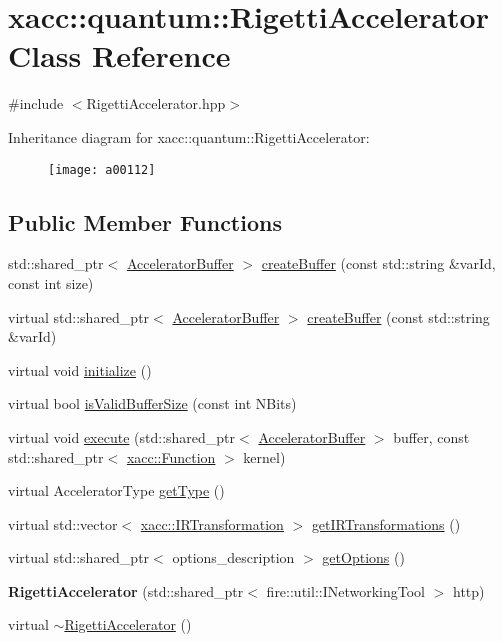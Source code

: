 \hypertarget{a00112}{}\section{xacc\+:\+:quantum\+:\+:Rigetti\+Accelerator Class Reference}
\label{a00112}


{\ttfamily \#include $<$Rigetti\+Accelerator.\+hpp$>$}

Inheritance diagram for xacc\+:\+:quantum\+:\+:Rigetti\+Accelerator\+:\begin{figure}[H]
\begin{center}
\leavevmode
\texttt{[image: a00112]}
\end{center}
\end{figure}
\subsection*{Public Member Functions}
\begin{DoxyCompactItemize}
\item 
std\+::shared\+\_\+ptr$<$ \hyperlink{a00019}{Accelerator\+Buffer} $>$ \hyperlink{a00112_a731551c94b1abef40d2cf032e8712df6}{create\+Buffer} (const std\+::string \&var\+Id, const int size)
\item 
virtual std\+::shared\+\_\+ptr$<$ \hyperlink{a00019}{Accelerator\+Buffer} $>$ \hyperlink{a00112_ada3ceb986e51ab5aa721f2a08e083cd6}{create\+Buffer} (const std\+::string \&var\+Id)
\item 
virtual void \hyperlink{a00112_ab8b6af9bb9dcb110201e9ee5cac74b4f}{initialize} ()
\item 
virtual bool \hyperlink{a00112_a61352c07062597aad2393fbeed4cc025}{is\+Valid\+Buffer\+Size} (const int N\+Bits)
\item 
virtual void \hyperlink{a00112_afce7bbd1b0f04300a9920952e9d12ef4}{execute} (std\+::shared\+\_\+ptr$<$ \hyperlink{a00019}{Accelerator\+Buffer} $>$ buffer, const std\+::shared\+\_\+ptr$<$ \hyperlink{a00059}{xacc\+::\+Function} $>$ kernel)
\item 
virtual Accelerator\+Type \hyperlink{a00112_aab0d4674da5273d55407b9ab77cde890}{get\+Type} ()
\item 
virtual std\+::vector$<$ \hyperlink{a00078}{xacc\+::\+I\+R\+Transformation} $>$ \hyperlink{a00112_a443683a1dfb000603c640b2ee303cf66}{get\+I\+R\+Transformations} ()
\item 
virtual std\+::shared\+\_\+ptr$<$ options\+\_\+description $>$ \hyperlink{a00112_a9ee9e62aecbccf193894ca3388676f9f}{get\+Options} ()
\item 
{\bfseries Rigetti\+Accelerator} (std\+::shared\+\_\+ptr$<$ fire\+::util\+::\+I\+Networking\+Tool $>$ http)\hypertarget{a00112_aa92ba39441ec9c261fbddee23a84d6ac}{}\label{a00112_aa92ba39441ec9c261fbddee23a84d6ac}

\item 
virtual \hyperlink{a00112_a7c86895d1c29afa8b7e18476144a3fcf}{$\sim$\+Rigetti\+Accelerator} ()
\end{DoxyCompactItemize}

